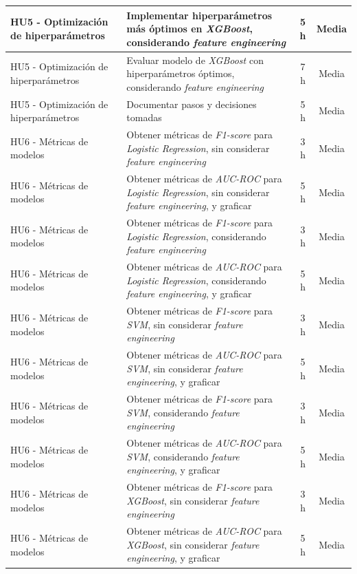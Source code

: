 \documentclass[
11pt, %
]{charter}
\begin{document}
\begin{xltabular}{\linewidth}{@{}|X|X|c|c|@{}}
HU5 - Optimización de hiperparámetros & Implementar hiperparámetros más óptimos en \textit{XGBoost}, considerando \textit{feature engineering} & 5 h & Media \\ \hline
HU5 - Optimización de hiperparámetros & Evaluar modelo de \textit{XGBoost} con hiperparámetros óptimos, considerando \textit{feature engineering} & 7 h & Media \\ \hline
HU5 - Optimización de hiperparámetros & Documentar pasos y decisiones tomadas & 5 h & Media \\ \hline
HU6 - Métricas de modelos & Obtener métricas de \textit{F1-score} para \textit{Logistic Regression}, sin  considerar \textit{feature engineering} & 3 h & Media \\ \hline
HU6 - Métricas de modelos & Obtener métricas de \textit{AUC-ROC} para \textit{Logistic Regression}, sin  considerar \textit{feature engineering}, y graficar & 5 h & Media \\ \hline
HU6 - Métricas de modelos & Obtener métricas de \textit{F1-score} para \textit{Logistic Regression}, considerando \textit{feature engineering} & 3 h & Media \\ \hline
HU6 - Métricas de modelos & Obtener métricas de \textit{AUC-ROC} para \textit{Logistic Regression}, considerando \textit{feature engineering}, y graficar & 5 h & Media \\ \hline
HU6 - Métricas de modelos & Obtener métricas de \textit{F1-score} para \textit{SVM}, sin  considerar \textit{feature engineering} & 3 h & Media \\ \hline
HU6 - Métricas de modelos & Obtener métricas de \textit{AUC-ROC} para \textit{SVM}, sin  considerar \textit{feature engineering}, y graficar & 5 h & Media \\ \hline
HU6 - Métricas de modelos & Obtener métricas de \textit{F1-score} para \textit{SVM}, considerando \textit{feature engineering} & 3 h & Media \\ \hline
HU6 - Métricas de modelos & Obtener métricas de \textit{AUC-ROC} para \textit{SVM}, considerando \textit{feature engineering}, y graficar & 5 h & Media \\ \hline
HU6 - Métricas de modelos & Obtener métricas de \textit{F1-score} para \textit{XGBoost}, sin  considerar \textit{feature engineering} & 3 h & Media \\ \hline
HU6 - Métricas de modelos & Obtener métricas de \textit{AUC-ROC} para \textit{XGBoost}, sin  considerar \textit{feature engineering}, y graficar & 5 h & Media \\ \hline

\end{xltabular}
\end{document}
